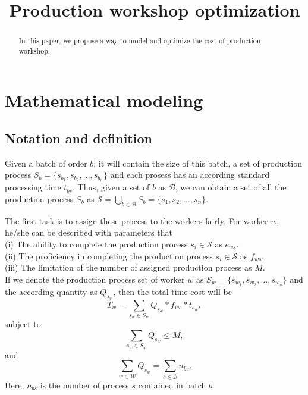 \documentclass[10pt,reqno]{amsart}
\numberwithin{equation}{section}
\begin{document}
\title{Production workshop optimization}%


\begin{abstract}
In this paper, we propose a way to model and optimize the cost of production workshop.
\end{abstract}
 \maketitle
 
\section{Mathematical modeling}\label{sec: model}
\subsection{Notation and definition}
Given a batch of order $b$, it will contain the size of this batch, a set of production process $S_b = \{s_{b_1}, s_{b_2}, \ldots, s_{b_n}\}$ and each prosess has an according standard processing time $t_{bs}$. Thus, given a set of $b$ as $\mathcal{B}$, we can obtain a set of all the production process $S_b$ as $\mathcal{S}=\bigcup\limits_{b\in\mathcal{B}} S_b = \{s_{1}, s_{2}, \ldots, s_{n}\}$.

The first task is to assign these process to the workers fairly. For worker $w$, he/she can be described with parameters that\\
(i)   The ability to complete the production process $s_i \in \mathcal{S}$ as $e_{ws}$.\\
(ii)  The proficiency in completing the production process $s_i \in \mathcal{S}$ as $f_{ws}$.\\
(iii) The limitation of the number of assigned production process as $M$.\\

If we denote the production process set of worker $w$ as $S_w = \{s_{w_1}, s_{w_2}, \ldots, s_{w_n}\}$ and the according quantity as $Q_{s_w}$, then the total time cost will be
\begin{equation}\label{cost_w}
    T_w = \sum_{s_w\in S_w} Q_{s_w}*f_{ws}*t_{s_w},
\end{equation}
subject to 
\begin{equation}\label{subject_w}
    \sum_{s_w\in S_w} Q_{s_w} \leq M,
\end{equation}
and
\begin{equation}\label{subjct_b}
    \sum_{w\in\mathcal{W}}Q_{s_w} = \sum_{b\in\mathcal{B}}n_{bs}.
\end{equation}
Here, $n_{bs}$ is the number of process $s$ contained in batch $b$.
\end{document}
